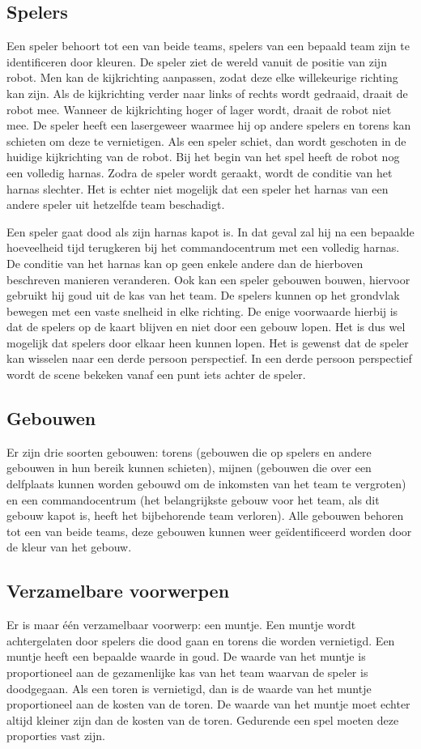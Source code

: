 \subsection{Spelers}
Een speler behoort tot een van beide teams, spelers van een bepaald team zijn te identificeren door kleuren. De speler ziet de wereld vanuit de positie van zijn robot. Men kan de kijkrichting aanpassen, zodat deze elke willekeurige richting kan zijn. Als de kijkrichting verder naar links of rechts wordt gedraaid, draait de robot mee. Wanneer de kijkrichting hoger of lager wordt, draait de robot niet mee. De speler heeft een lasergeweer waarmee hij op andere spelers en torens kan schieten om deze te vernietigen. Als een speler schiet, dan wordt geschoten in de huidige kijkrichting van de robot. Bij het begin van het spel heeft de robot nog een volledig harnas. Zodra de speler wordt geraakt, wordt de conditie van het harnas slechter. Het is echter niet mogelijk dat een speler het harnas van een andere speler uit hetzelfde team beschadigt.

Een speler gaat dood als zijn harnas kapot is. In dat geval zal hij na een bepaalde hoeveelheid tijd terugkeren bij het commandocentrum met een volledig harnas. De conditie van het harnas kan op geen enkele andere dan de hierboven beschreven manieren veranderen. Ook kan een speler gebouwen bouwen, hiervoor gebruikt hij goud uit de kas van het team. De spelers kunnen op het grondvlak bewegen met een vaste snelheid in elke richting. De enige voorwaarde hierbij is dat de spelers op de kaart blijven en niet door een gebouw lopen. Het is dus wel mogelijk dat spelers door elkaar heen kunnen lopen. Het is gewenst dat de speler kan wisselen naar een derde persoon perspectief. In een derde persoon perspectief wordt de scene bekeken vanaf een punt iets achter de speler. 
\subsection{Gebouwen}
Er zijn drie soorten gebouwen: torens (gebouwen die op spelers en andere gebouwen in hun bereik kunnen schieten), mijnen (gebouwen die over een delfplaats kunnen worden gebouwd om de inkomsten van het team te vergroten) en een commandocentrum (het belangrijkste gebouw voor het team, als dit gebouw kapot is, heeft het bijbehorende team verloren). Alle gebouwen behoren tot een van beide teams, deze gebouwen kunnen weer ge\"identificeerd worden door de kleur van het gebouw.

\subsection{Verzamelbare voorwerpen}
Er is maar \'e\'en verzamelbaar voorwerp: een muntje. Een muntje wordt achtergelaten door spelers die dood gaan en torens die worden vernietigd. Een muntje heeft een bepaalde waarde in goud. De waarde van het muntje is proportioneel aan de gezamenlijke kas van het team waarvan de speler is doodgegaan. Als een toren is vernietigd, dan is de waarde van het muntje proportioneel aan de kosten van de toren. De waarde van het muntje moet echter altijd kleiner zijn dan de kosten van de toren. Gedurende een spel moeten deze proporties vast zijn.

